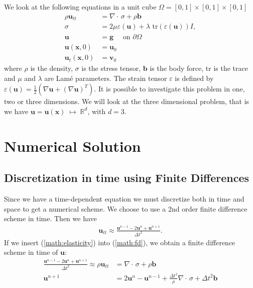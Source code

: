 \documentclass[twoside]{article}
\begin{document}
We look at the following equations in a unit cube \( \Omega = [0, 1] \times [0, 1] \times [0, 1] \)
\begin{align}
    \rho \mathbf{u}_{tt} &= \nabla \cdot \,\sigma + \rho \mathbf{b} \label{math:elasticity}\\
    \sigma &= 2 \mu \varepsilon(\mathbf{\mathbf{u}}) + \lambda \text{ tr}(\varepsilon(\mathbf{u})) I, \label{math:sigma} \\
    \mathbf{u} &= \mathbf{g} \quad \text{ on } \partial \Omega \\
    \mathbf{u}(\mathbf{x}, 0) &= \mathbf{u}_0 \label{eq_first_init}\\
    \mathbf{u}_t(\mathbf{x}, 0) &= \mathbf{v}_0 \label{eq:sec_init}
\end{align}
where \( \rho\) is the density, \( \sigma\) is the stress tensor, \( \mathbf{b}\) is the body force, tr is the trace and \( \mu\) and \( \lambda\) are Lam\'{e} parameters.
The strain tensor \( \varepsilon\) is defined by \( \varepsilon(\mathbf{u}) = \frac{1}{2} \left( \nabla \mathbf{u} + (\nabla \mathbf{u})^T \right)\).
It is possible to investigate this problem in one, two or three dimensions.
We will look at the three dimensional problem, that is we have \( \mathbf{u} = \mathbf{u}(\mathbf{x}) \; \longmapsto \; \mathbb{R}^d\), with \( d = 3\).



\section{Numerical Solution}
\subsection{Discretization in time using Finite Differences}
\label{timediscretization}
Since we have a time-dependent equation we must discretize both in time and space to get a numerical scheme. 
We choose to use a 2nd order finite difference scheme in time. Then we have
\begin{align}
	\mathbf{u}_{tt} \approx \frac{\mathbf{u}^{n-1} - 2 \mathbf{u}^n + \mathbf{u}^{n+1}}{\Delta t^2}. \label{math:fd}
\end{align}
If we insert (\ref{math:elasticity}) into  (\ref{math:fd}), we obtain a finite difference scheme in time of \(\mathbf{u}\):
\begin{align*}
	\frac{\mathbf{u}^{n-1} - 2 \mathbf{u}^n + \mathbf{u}^{n+1}}{\Delta t^2} \approx \rho \mathbf{u}_{tt} &= \nabla \cdot \,\sigma + \rho \mathbf{b}   \\
	\mathbf{u}^{n+1} &= 2 \mathbf{u}^n - \mathbf{u}^{n-1} + \frac{\Delta t^2}{\rho} \nabla \cdot \,\sigma + \Delta t^2 \mathbf{b} 
\end{align*}
\end{document}

